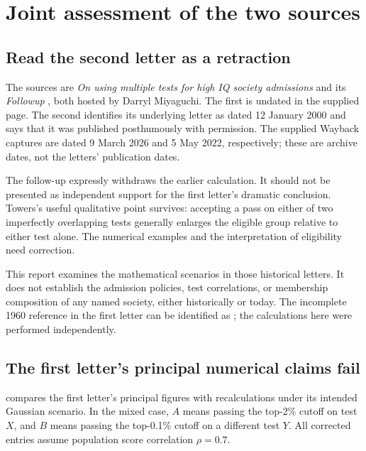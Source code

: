 \tableofcontents
\mainmatter
\chapter{Joint assessment of the two sources}\label{sec:audit}

\section{Read the second letter as a retraction}

The sources are \emph{On using multiple tests for high IQ society admissions}
\citep{towersOriginal} and its \emph{Followup} \citep{towersFollowup}, both
hosted by Darryl Miyaguchi. The first is undated in the supplied page. The
second identifies its underlying letter as dated 12 January 2000 and says
that it was published posthumously with permission. The supplied Wayback
captures are dated 9 March 2026 and 5 May 2022, respectively; these are
archive dates, not the letters' publication dates.

The follow-up expressly withdraws the earlier calculation. It should not
be presented as independent support for the first letter's dramatic
conclusion. Towers's useful qualitative point survives: accepting a pass
on either of two imperfectly overlapping tests generally enlarges the
eligible group relative to either test alone. The numerical examples and
the interpretation of eligibility need correction.

This report examines the mathematical scenarios in those historical
letters. It does not establish the admission policies, test correlations,
or membership composition of any named society, either historically or
today. The incomplete 1960 reference in the first letter can be identified
as \citet{zelen1960}; the calculations here were performed independently.

\section{The first letter's principal numerical claims fail}

 compares the first letter's principal figures with
recalculations under its intended Gaussian scenario. In the mixed case,
\(A\) means passing the top-2\% cutoff on test \(X\), and \(B\) means
passing the top-0.1\% cutoff on a different test \(Y\). All corrected entries
assume population score correlation \(\rho=0.7\).

